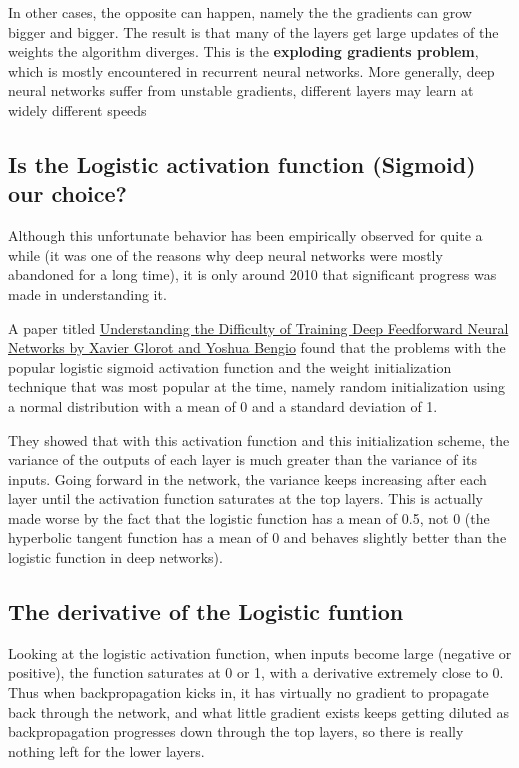 \documentclass[%
oneside,                 %
final,                   %
10pt]{article}
\begin{document}
In other cases, the opposite can happen, namely the the gradients can
grow bigger and bigger. The result is that many of the layers get
large updates of the weights the algorithm diverges. This is the
\textbf{exploding gradients problem}, which is mostly encountered in
recurrent neural networks. More generally, deep neural networks suffer
from unstable gradients, different layers may learn at widely
different speeds

\subsection{Is the Logistic activation function (Sigmoid)  our choice?}

Although this unfortunate behavior has been empirically observed for
quite a while (it was one of the reasons why deep neural networks were
mostly abandoned for a long time), it is only around 2010 that
significant progress was made in understanding it.

A paper titled \href{{http://proceedings.mlr.press/v9/glorot10a.html}}{Understanding the Difficulty of Training Deep
Feedforward Neural Networks by Xavier Glorot and Yoshua Bengio} found that
the problems with the popular logistic
sigmoid activation function and the weight initialization technique
that was most popular at the time, namely random initialization using
a normal distribution with a mean of 0 and a standard deviation of
1. 

They showed that with this activation function and this
initialization scheme, the variance of the outputs of each layer is
much greater than the variance of its inputs. Going forward in the
network, the variance keeps increasing after each layer until the
activation function saturates at the top layers. This is actually made
worse by the fact that the logistic function has a mean of 0.5, not 0
(the hyperbolic tangent function has a mean of 0 and behaves slightly
better than the logistic function in deep networks).

\subsection{The derivative of the Logistic funtion}

Looking at the logistic activation function, when inputs become large
(negative or positive), the function saturates at 0 or 1, with a
derivative extremely close to 0. Thus when backpropagation kicks in,
it has virtually no gradient to propagate back through the network,
and what little gradient exists keeps getting diluted as
backpropagation progresses down through the top layers, so there is
really nothing left for the lower layers.
\end{document}
